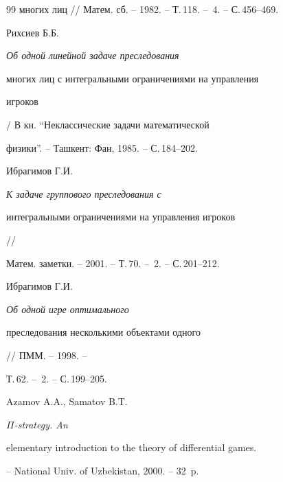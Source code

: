 \begin{thebibliography}{99}
{многих лиц} // Матем. сб. -- 1982. -- Т.\,118. -- \No\,4. -- С.\,456--469.




Рихсиев Б.Б. { \em  Об одной линейной задаче преследования


многих лиц с интегральными ограничениями на управления


игроков} / В кн. ``Неклассические задачи математической


физики''. -- Ташкент: Фан, 1985. -- С.\,184--202.




Ибрагимов Г.И. { \em К задаче группового преследования с


интегральными ограничениями на управления игроков} //


Матем. заметки. -- 2001. -- Т.\,70. -- \No\,2. -- С.\,201--212.




Ибрагимов Г.И. { \em Об одной игре оптимального


преследования несколькими объектами одного} // ПММ. -- 1998. --


Т.\,62. -- \No\,2. -- С.\,199--205.




Azamov A.A., Samatov B.T. {\em $\Pi$-strategy. An


elementary introduction to the theory of differential games.}


-- National Univ. of Uzbekistan, 2000. -- 32~p.





\end{thebibliography}





\vskip 2cm












\label{end}





